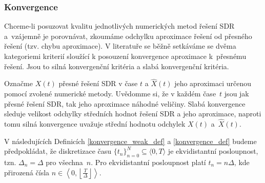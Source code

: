 \documentclass[a4paper,12pt]{report}
\theoremstyle{definition} \newtheorem{definice}[veta]{Definice}
\theoremstyle{remark}
\begin{document}
\subsubsection{Konvergence}
Chceme-li posuzovat kvalitu jednotlivých numerických metod řešení SDR a~vzájemně je porovnávat, zkoumáme odchylku aproximace řešení od přesného řešení (tzv. chybu aproximace).
V literatuře se běžně setkáváme se dvěma kategoriemi kriterií sloužící k posouzení konvergence aproximace k~přesnému řešení.
Jsou to silná konvergenční kritéria a slabá konvergenční kritéria. 

Označme $X(t)$ přesné řešení SDR v čase $t$ a $\hat X(t)$ jeho aproximaci určenou pomocí zvolené numerické metody.
Uvědomme si, že v každém čase~$t$ jsou jak přesné řešení SDR, tak jeho aproximace náhodné veličiny.
Slabá konvergence sleduje velikost odchylky středních hodnot řešení SDR a jeho aproximace, naproti tomu silná konvergence uvažuje střední hodnotu odchylek $X(t)$ a~$\hat X(t)$.

V následujících Definicích \ref{konvergence_weak_def} a \ref{konvergence_def} budeme předpokládat, že diskretizace času $\{t_n\}_{n=0}^N\subseteq \langle0,T\rangle$ je ekvidistantní posloupnost, tzn. $\Delta_n=\Delta$ pro všechna~$n$.
Pro ekvidistantní posloupnost platí $t_n=n\Delta$, kde přirozená čísla $n\in\left\langle0,\left\lfloor\frac{T}{\Delta}\right\rfloor\right\rangle$.
\end{document}

